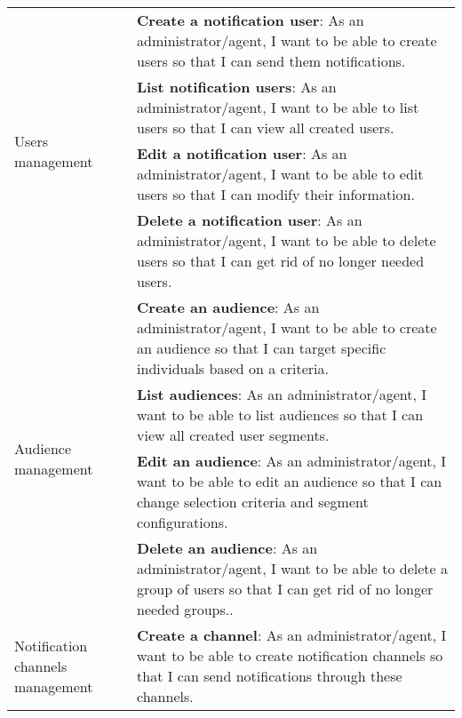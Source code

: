 \begin{longtable}{ | m{}  | m{} | }
      \hline
      \multirow[t]{4}{5em}{Users management}                  & \textbf{Create a notification user}: As an administrator/agent, I want to be able to create users so that I can send them notifications.                                                     \\
      \cline{2-2}
                                                              & \textbf{List notification users}: As an administrator/agent, I want to be able to list users so that I can view all created users.                                                           \\
      \cline{2-2}
                                                              & \textbf{Edit a notification user}: As an administrator/agent, I want to be able to edit users so that I can modify their information.                                                        \\
      \cline{2-2}
                                                              & \textbf{Delete a notification user}: As an administrator/agent, I want to be able to delete users so that I can get rid of no longer needed users.                                           \\
      \hline
      \multirow[t]{4}{5em}{Audience management}               & \textbf{Create an audience}: As an administrator/agent, I want to be able to create an audience so that I can target specific individuals based on a criteria.                               \\
      \cline{2-2}
                                                              & \textbf{List audiences}: As an administrator/agent, I want to be able to list audiences so that I can view all created user segments.                                                        \\
      \cline{2-2}
                                                              & \textbf{Edit an audience}: As an administrator/agent, I want to be able to edit an audience so that I can change selection criteria and segment configurations.                              \\
      \cline{2-2}
                                                              & \textbf{Delete an audience}: As an administrator/agent, I want to be able to delete a group of users so that I can get rid of no longer needed groups..                                      \\
      \hline
      \multirow[t]{4}{5em}{Notification channels management}  & \textbf{Create a channel}: As an administrator/agent, I want to be able to create notification channels so that I can send notifications through these channels.                             \\

\end{longtable}
